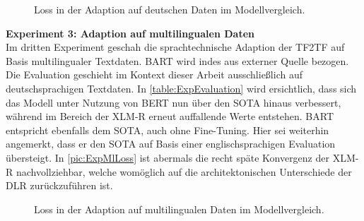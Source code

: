 \begin{figure}[h]
  \centering
  \caption{Loss in der Adaption auf deutschen Daten im Modellvergleich.}
  \label{pic:ExpDeLoss}
\end{figure}

\noindent
\textbf{Experiment 3: Adaption auf multilingualen Daten}\\
\noindent
Im dritten Experiment geschah die sprachtechnische Adaption der \ac{TF2TF} auf Basis multilingualer Textdaten. \ac{BART} wird indes aus externer Quelle bezogen. Die Evaluation geschieht im Kontext dieser Arbeit ausschließlich auf deutschsprachigen Textdaten. In \autoref{table:ExpEvaluation} wird ersichtlich, dass sich das Modell unter Nutzung von \ac{BERT} nun über den \ac{SOTA} hinaus verbessert, während im Bereich der \ac{XLM-R} erneut auffallende Werte entstehen. \ac{BART} entspricht ebenfalls dem \ac{SOTA}, auch ohne Fine-Tuning. Hier sei weiterhin angemerkt, dass er den \ac{SOTA} auf Basis einer englischsprachigen Evaluation übersteigt. In \autoref{pic:ExpMlLoss} ist abermals die recht späte Konvergenz der \ac{XLM-R} nachvollziehbar, welche womöglich auf die architektonischen Unterschiede der \ac{DLR} zurückzuführen ist.\\

\begin{figure}[h]
  \centering
  \caption{Loss in der Adaption auf multilingualen Daten im Modellvergleich.}
  \label{pic:ExpMlLoss}
\end{figure}
\newpage


